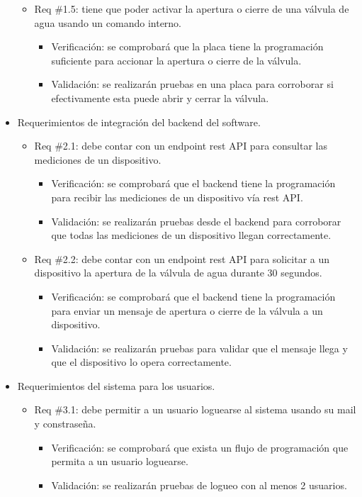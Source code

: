 \documentclass[
11pt, %
codirector, %
]{charter}
\begin{document}
\begin{itemize}
\begin{itemize}
	\item Req \#1.5: tiene que poder activar la apertura o cierre de una válvula de agua usando un comando interno.
		\begin{itemize}
		\item Verificación: se comprobará que la placa tiene la programación suficiente para accionar la apertura o cierre de la válvula.
		\item Validación: se realizarán pruebas en una placa para corroborar si efectivamente esta puede abrir y cerrar la válvula.\\
		\end{itemize}
		
	\end{itemize}
	
\item Requerimientos de integración del backend del software.
	\begin{itemize}
	\item Req \#2.1: debe contar con un endpoint rest API para consultar las mediciones de un dispositivo.
		\begin{itemize}
		\item Verificación: se comprobará que el backend tiene la programación para recibir las mediciones de un dispositivo vía rest API.
		\item Validación: se realizarán pruebas desde el backend para corroborar que todas las mediciones de un dispositivo llegan correctamente.\\
		\end{itemize}
		
	\item Req \#2.2: debe contar con un endpoint rest API para solicitar a un dispositivo la apertura de la válvula de agua durante 30 segundos.
		\begin{itemize}
		\item Verificación: se comprobará que el backend tiene la programación para enviar un mensaje de apertura o cierre de la válvula a un dispositivo.
		\item Validación: se realizarán pruebas para validar que el mensaje llega y que el dispositivo lo opera correctamente.\\
		\end{itemize}
		
	\end{itemize}

\item Requerimientos del sistema para los usuarios.
	\begin{itemize}
	\item Req \#3.1: debe permitir a un usuario loguearse al sistema usando su mail y constraseña.
		\begin{itemize}
		\item Verificación: se comprobará que exista un flujo de programación que permita a un usuario loguearse.
		\item Validación: se realizarán pruebas de logueo con al menos 2 usuarios.\\
		\end{itemize}
		

\end{itemize}
\end{itemize}
\end{document}
